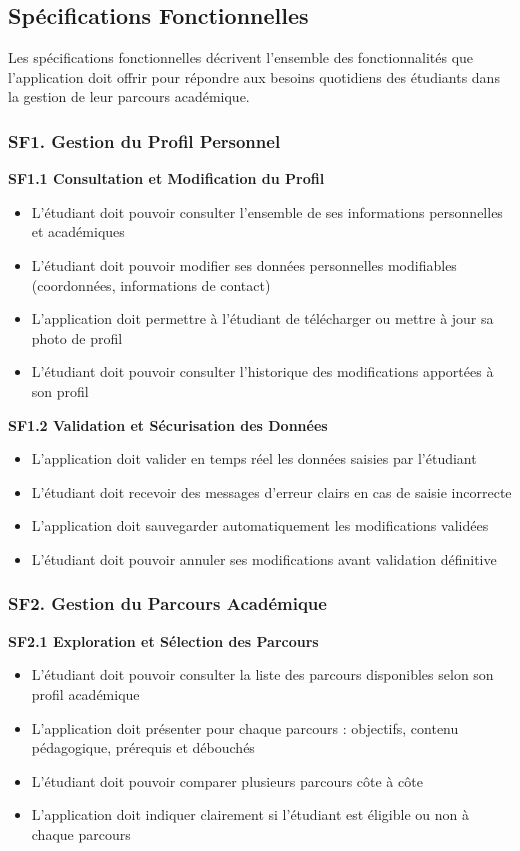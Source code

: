\documentclass[12pt,a4paper]{report}
\begin{document}
\subsection{Spécifications Fonctionnelles}

Les spécifications fonctionnelles décrivent l'ensemble des fonctionnalités que l'application doit offrir pour répondre aux besoins quotidiens des étudiants dans la gestion de leur parcours académique.

\subsubsection{SF1. Gestion du Profil Personnel}

\textbf{SF1.1 Consultation et Modification du Profil}
\begin{itemize}
\item L'étudiant doit pouvoir consulter l'ensemble de ses informations personnelles et académiques
\item L'étudiant doit pouvoir modifier ses données personnelles modifiables (coordonnées, informations de contact)
\item L'application doit permettre à l'étudiant de télécharger ou mettre à jour sa photo de profil
\item L'étudiant doit pouvoir consulter l'historique des modifications apportées à son profil
\end{itemize}

\textbf{SF1.2 Validation et Sécurisation des Données}
\begin{itemize}
\item L'application doit valider en temps réel les données saisies par l'étudiant
\item L'étudiant doit recevoir des messages d'erreur clairs en cas de saisie incorrecte
\item L'application doit sauvegarder automatiquement les modifications validées
\item L'étudiant doit pouvoir annuler ses modifications avant validation définitive
\end{itemize}

\subsubsection{SF2. Gestion du Parcours Académique}

\textbf{SF2.1 Exploration et Sélection des Parcours}
\begin{itemize}
\item L'étudiant doit pouvoir consulter la liste des parcours disponibles selon son profil académique
\item L'application doit présenter pour chaque parcours : objectifs, contenu pédagogique, prérequis et débouchés
\item L'étudiant doit pouvoir comparer plusieurs parcours côte à côte
\item L'application doit indiquer clairement si l'étudiant est éligible ou non à chaque parcours
\end{itemize}
\end{document}
